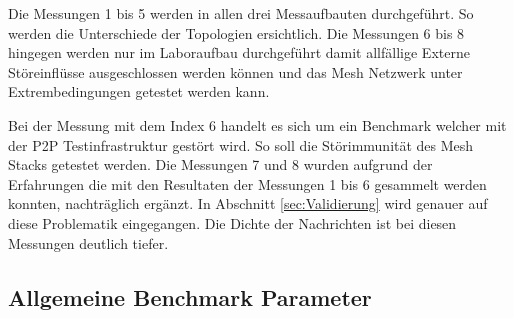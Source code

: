 \begin{table}[h]
\centering
{}
\caption{Bedeutung Benchmark Parameter}
\label{tab:BedeutungBenchmarkParameter}
\end{table}

Die Messungen 1 bis 5 werden in allen drei Messaufbauten durchgeführt. So werden die Unterschiede der Topologien ersichtlich.
Die Messungen 6 bis 8 hingegen werden nur im Laboraufbau durchgeführt damit allfällige Externe Störeinflüsse ausgeschlossen werden können und das Mesh Netzwerk unter Extrembedingungen getestet werden kann.

Bei der Messung mit dem Index 6 handelt es sich um ein Benchmark welcher mit der P2P Testinfrastruktur gestört wird. So soll die Störimmunität des Mesh Stacks getestet werden.
Die Messungen 7 und 8 wurden aufgrund der Erfahrungen die mit den Resultaten der Messungen 1 bis 6 gesammelt werden konnten, nachträglich ergänzt. In Abschnitt \ref{sec:Validierung} wird genauer auf diese Problematik eingegangen.
Die Dichte der Nachrichten ist bei diesen Messungen deutlich tiefer.





\subsection{Allgemeine Benchmark Parameter}\label{subsec:AllgemeineBenchmarkParameter}

